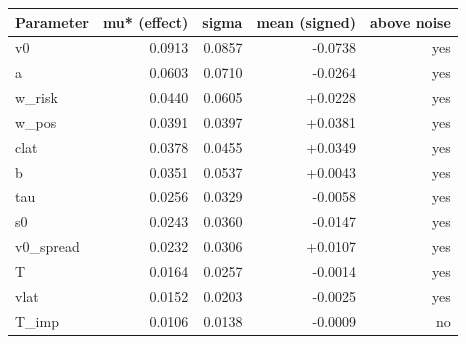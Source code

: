 \begin{tabular}{|l|r|r|r|r|}
\hline
\textbf{Parameter} & \textbf{mu* (effect)} & \textbf{sigma} & \textbf{mean (signed)} & \textbf{above noise} \\
\hline
v0 & 0.0913 & 0.0857 & -0.0738 & yes \\
a & 0.0603 & 0.0710 & -0.0264 & yes \\
w\_risk & 0.0440 & 0.0605 & +0.0228 & yes \\
w\_pos & 0.0391 & 0.0397 & +0.0381 & yes \\
clat & 0.0378 & 0.0455 & +0.0349 & yes \\
b & 0.0351 & 0.0537 & +0.0043 & yes \\
tau & 0.0256 & 0.0329 & -0.0058 & yes \\
s0 & 0.0243 & 0.0360 & -0.0147 & yes \\
v0\_spread & 0.0232 & 0.0306 & +0.0107 & yes \\
T & 0.0164 & 0.0257 & -0.0014 & yes \\
vlat & 0.0152 & 0.0203 & -0.0025 & yes \\
T\_imp & 0.0106 & 0.0138 & -0.0009 & no \\
\hline
\end{tabular}
